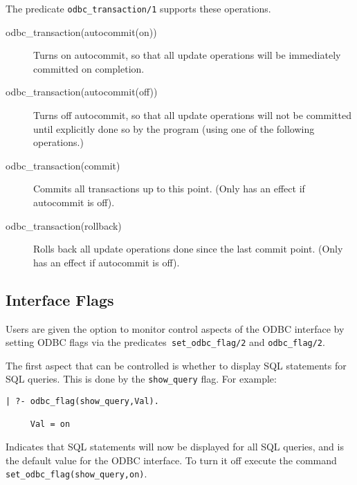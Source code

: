 The predicate {\tt odbc\_transaction/1} supports these operations.

\begin{description}
\item[odbc\_transaction(autocommit(on))]
        Turns on autocommit, so that all update operations will be
        immediately committed on completion.
\item[odbc\_transaction(autocommit(off))]
        Turns off autocommit, so that all update operations will not
        be committed until explicitly done so by the program (using
        one of the following operations.)
\item[odbc\_transaction(commit)]
        Commits all transactions up to this point.  (Only has an
        effect if autocommit is off).
\item[odbc\_transaction(rollback)]
        Rolls back all update operations done since the last commit
        point.  (Only has an effect if autocommit is off).
\end{description}


\subsection{Interface Flags}

Users are given the option to monitor control aspects of the ODBC
interface by setting ODBC flags via the predicates{\tt
set\_odbc\_flag/2} and {\tt odbc\_flag/2}.

The first aspect that can be controlled is whether to display SQL
statements for SQL queries.  This is done by the {\tt show\_query}
flag.  For example: 
%
\begin{verbatim}
| ?- odbc_flag(show_query,Val).

     Val = on
\end{verbatim}
%
Indicates that SQL statements will now be displayed for all SQL
queries, and is the default value for the ODBC interface.  To turn it
off execute the command {\tt set\_odbc\_flag(show\_query,on)}.  

